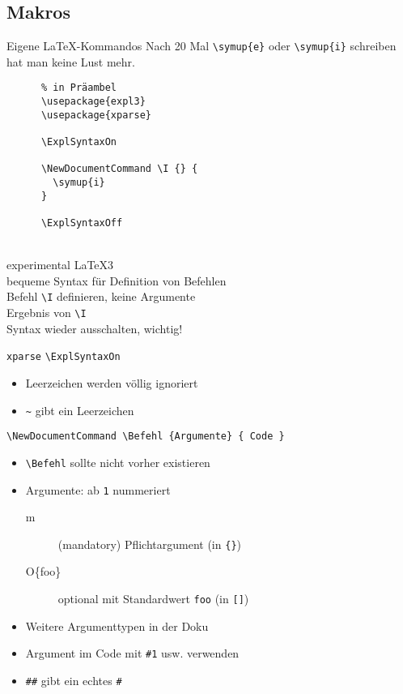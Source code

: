 \subsection{Makros}

\begin{frame}[fragile]{Eigene \LaTeX-Kommandos}
  Nach 20 Mal \lstinline+\symup{e}+ oder \lstinline+\symup{i}+ schreiben hat man keine Lust mehr.

  \vspace{2em}
  \begin{CodeExplanation}{0.45}
    \begin{lstlisting}
      % in Präambel
      \usepackage{expl3}
      \usepackage{xparse}

      \ExplSyntaxOn

      \NewDocumentCommand \I {} {
        \symup{i}
      }

      \ExplSyntaxOff
    \end{lstlisting}
  \Explanation
    \strut \\[0.5\baselineskip]
    experimental \LaTeX3 \\[2\baselineskip]
    bequeme Syntax für Definition von Befehlen \\[1\baselineskip]
    Befehl \lstinline+\I+ definieren, keine Argumente \\
    Ergebnis von \lstinline+\I+ \\[2\baselineskip]
    Syntax wieder ausschalten, wichtig!
  \end{CodeExplanation}
\end{frame}

\begin{frame}[fragile]{
  \texttt{xparse}
  \hfill
}
  \lstinline+\ExplSyntaxOn+
  \begin{itemize}
    \item Leerzeichen werden völlig ignoriert
    \item \lstinline+~+ gibt ein Leerzeichen
  \end{itemize}

  \lstinline+\NewDocumentCommand \Befehl {Argumente} { Code }+
  \begin{itemize}
    \item \lstinline+\Befehl+ sollte nicht vorher existieren
    \item Argumente: ab \texttt{1} nummeriert
      \begin{description}
        \item[m] (mandatory) Pflichtargument (in \lstinline+{}+)
        \item[O\{foo\}] optional mit Standardwert \texttt{foo} (in \lstinline+[]+)
      \end{description}
    \item Weitere Argumenttypen in der Doku
    \item Argument im Code mit \lstinline+#1+ usw. verwenden
    \item \lstinline+##+ gibt ein echtes \lstinline+#+
  \end{itemize}
\end{frame}

